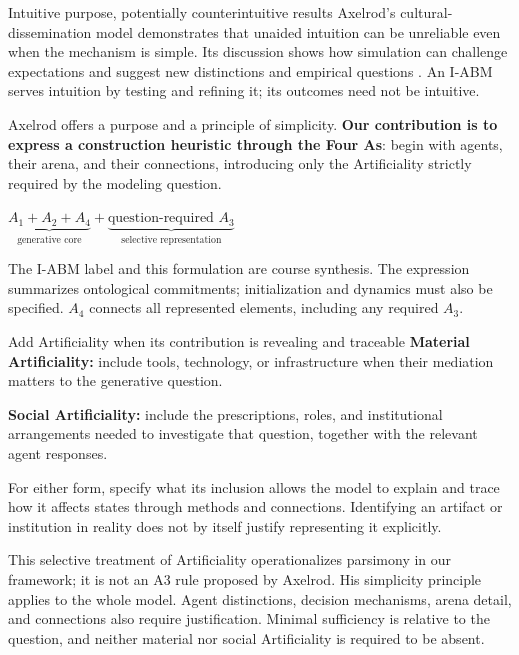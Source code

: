 \documentclass[11pt,a4paper]{article}
\newenvironment{fitdisplay}{\par\medskip\noindent\begin{lrbox}{\displaybox}$\displaystyle}{%
$\end{lrbox}\makebox[\linewidth][c]{\ifdim\wd\displaybox>\linewidth\resizebox{\linewidth}{!}{\usebox{\displaybox}}\else\usebox{\displaybox}\fi}\par\medskip}
\begin{document}
\begin{principle}{Intuitive purpose, potentially counterintuitive results}
Axelrod's cultural-dissemination model demonstrates that unaided intuition can be unreliable even when the mechanism is simple. Its discussion shows how simulation can challenge expectations and suggest new distinctions and empirical questions \cite[pp.~219--220]{axelrod_dissemination_1997}. An I-ABM serves intuition by testing and refining it; its outcomes need not be intuitive.
\end{principle}

Axelrod offers a purpose and a principle of simplicity. \textbf{Our contribution is to express a construction heuristic through the Four As}: begin with agents, their arena, and their connections, introducing only the Artificiality strictly required by the modeling question.

\begin{fitdisplay}
\boxed{\underbrace{A_1+A_2+A_4}_{\text{generative core}}+
\underbrace{\text{question-required }A_3}_{\text{selective representation}}}
\end{fitdisplay}

The I-ABM label and this formulation are course synthesis. The expression summarizes ontological commitments; initialization and dynamics must also be specified. $A_4$ connects all represented elements, including any required $A_3$.

\begin{principle}{Add Artificiality when its contribution is revealing and traceable}
\textbf{Material Artificiality:} include tools, technology, or infrastructure when their mediation matters to the generative question.

\textbf{Social Artificiality:} include the prescriptions, roles, and institutional arrangements needed to investigate that question, together with the relevant agent responses.

For either form, specify what its inclusion allows the model to explain and trace how it affects states through methods and connections. Identifying an artifact or institution in reality does not by itself justify representing it explicitly.
\end{principle}

This selective treatment of Artificiality operationalizes parsimony in our framework; it is not an A3 rule proposed by Axelrod. His simplicity principle applies to the whole model. Agent distinctions, decision mechanisms, arena detail, and connections also require justification. Minimal sufficiency is relative to the question, and neither material nor social Artificiality is required to be absent.
\end{document}
